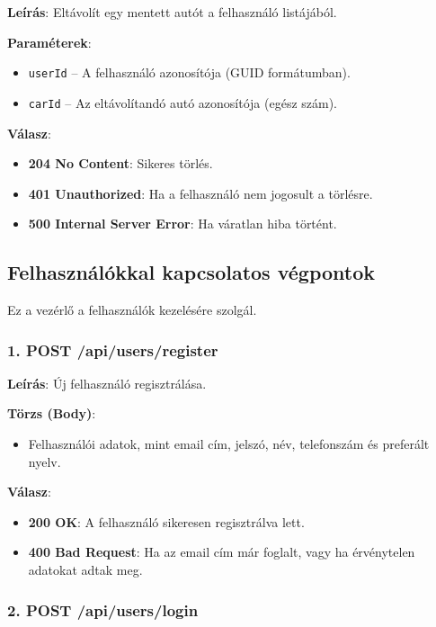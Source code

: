 \documentclass{report}[11pt]
\begin{document}
\textbf{Leírás}:  
Eltávolít egy mentett autót a felhasználó listájából.

\textbf{Paraméterek}:  
\begin{itemize}
    \item \texttt{userId} – A felhasználó azonosítója (GUID formátumban).
    \item \texttt{carId} – Az eltávolítandó autó azonosítója (egész szám).
\end{itemize}

\textbf{Válasz}:  
\begin{itemize}
    \item \textbf{204 No Content}: Sikeres törlés.
    \item \textbf{401 Unauthorized}: Ha a felhasználó nem jogosult a törlésre.
    \item \textbf{500 Internal Server Error}: Ha váratlan hiba történt.
\end{itemize}


\subsection{Felhasználókkal kapcsolatos végpontok}

Ez a vezérlő a felhasználók kezelésére szolgál.

\subsubsection{1. POST /api/users/register}

\textbf{Leírás}:  
Új felhasználó regisztrálása.

\textbf{Törzs (Body)}:  
\begin{itemize}
    \item Felhasználói adatok, mint email cím, jelszó, név, telefonszám és preferált nyelv.
\end{itemize}

\textbf{Válasz}:  
\begin{itemize}
    \item \textbf{200 OK}: A felhasználó sikeresen regisztrálva lett.
    \item \textbf{400 Bad Request}: Ha az email cím már foglalt, vagy ha érvénytelen adatokat adtak meg.
\end{itemize}

\subsubsection{2. POST /api/users/login}
\end{document}
